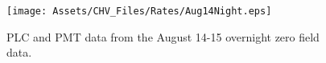 \begin{figure}
\centering
\texttt{[image: Assets/CHV\_Files/Rates/Aug14Night.eps]}
\caption[PLC and PMT data from the August 14-15 overnight zero field data.]%
{PLC and PMT data from the August 14-15 overnight zero field data.}
\label{fig:Aug14overnight}
\end{figure}






